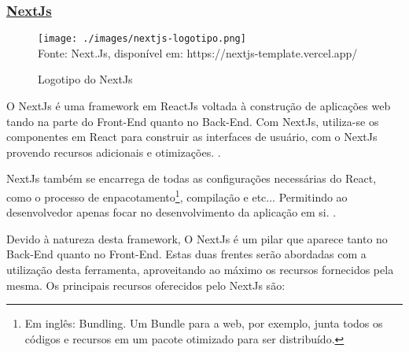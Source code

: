 \subsubsection{\underline{NextJs}}

\begin{figure}[H]
    \centering
    \caption{Logotipo do NextJs}
    \texttt{[image: ./images/nextjs-logotipo.png]}
    \label{fig:nextjs-logotipo} \\
    \textnormal{\fontsize{10pt}{12pt}Fonte: Next.Js, disponível em: https://nextjs-template.vercel.app/}
\end{figure}

O NextJs é uma framework em ReactJs voltada à construção de aplicações
\acrshort{web}
tando na parte do Front-End quanto no Back-End.
Com NextJs, utiliza-se os componentes em React para construir as interfaces
de usuário, com o NextJs provendo recursos adicionais e otimizações.
\cite{nexjs-docs}.

NextJs também se encarrega de todas as configurações necessárias do React, como o processo
de
enpacotamento\footnote{Em inglês: Bundling. Um Bundle para a \acrshort{web},
    por exemplo, junta todos os códigos e recursos em um pacote otimizado
    para ser distribuído.
},
compilação e etc...
Permitindo ao desenvolvedor apenas focar no desenvolvimento da aplicação em si.
\cite{nexjs-docs}.

Devido à natureza desta framework, O NextJs é um pilar que aparece
tanto no Back-End quanto no Front-End. Estas duas frentes serão abordadas
com a utilização desta ferramenta, aproveitando ao máximo os recursos fornecidos
pela mesma. Os principais recursos oferecidos pelo NextJs são:

